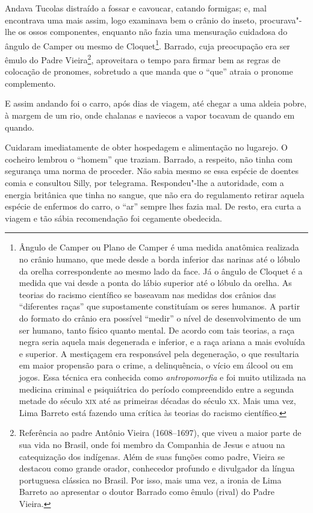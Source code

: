 Andava Tucolas distraído a fossar e cavoucar, catando formigas; e, mal
encontrava uma mais assim, logo examinava bem o crânio do inseto,
procurava"-lhe os ossos componentes, enquanto não fazia uma mensuração
cuidadosa do ângulo de Camper ou mesmo de Cloquet\footnote{Ângulo de
  Camper ou Plano de Camper é uma medida anatômica realizada no crânio
  humano, que mede desde a borda inferior das narinas até o lóbulo da
  orelha correspondente ao mesmo lado da face. Já o ângulo de Cloquet é
  a medida que vai desde a ponta do lábio superior até o lóbulo da
  orelha. As teorias do racismo científico se baseavam nas medidas dos
  crânios das ``diferentes raças'' que supostamente constituíam os seres
  humanos. A partir do formato do crânio era possível ``medir'' o nível
  de desenvolvimento de um ser humano, tanto físico quanto mental. De
  acordo com tais teorias, a raça negra seria aquela mais degenerada e
  inferior, e a raça ariana a mais evoluída e superior. A mestiçagem era
  responsável pela degeneração, o que resultaria em maior propensão para
  o crime, a delinquência, o vício em álcool ou em jogos. Essa técnica
  era conhecida como \emph{antropomorfia} e foi muito utilizada na
  medicina criminal e psiquiátrica do período compreendido entre a
  segunda metade do século \textsc{xix} até as primeiras décadas do século \textsc{xx}.
  Mais uma vez, Lima Barreto está fazendo uma crítica às teorias do
  racismo científico.}. Barrado, cuja preocupação era ser êmulo do Padre
Vieira\footnote{Referência ao padre Antônio Vieira (1608--1697), que
  viveu a maior parte de sua vida no Brasil, onde foi membro da
  Companhia de Jesus e atuou na catequização dos indígenas. Além de suas
  funções como padre, Vieira se destacou como grande orador, conhecedor
  profundo e divulgador da língua portuguesa clássica no Brasil. Por
  isso, mais uma vez, a ironia de Lima Barreto ao apresentar o doutor
  Barrado como êmulo (rival) do Padre Vieira.}, aproveitara o tempo para
firmar bem as regras de colocação de pronomes, sobretudo a que manda que
o ``que'' atraia o pronome complemento.

E assim andando foi o carro, após dias de viagem, até chegar a uma
aldeia pobre, à margem de um rio, onde chalanas e naviecos a vapor
tocavam de quando em quando.

Cuidaram imediatamente de obter hospedagem e alimentação no lugarejo. O
cocheiro lembrou o ``homem'' que traziam. Barrado, a respeito, não tinha
com segurança uma norma de proceder. Não sabia mesmo se essa espécie de
doentes comia e consultou Silly, por telegrama. Respondeu"-lhe a
autoridade, com a energia britânica que tinha no sangue, que não era do
regulamento retirar aquela espécie de enfermos do carro, o ``ar'' sempre
lhes fazia mal. De resto, era curta a viagem e tão sábia recomendação
foi cegamente obedecida.

